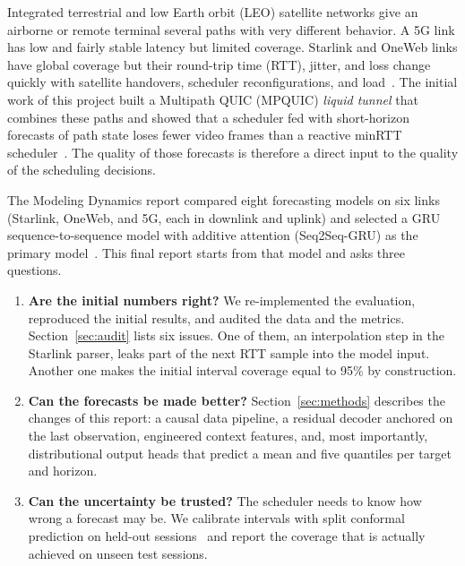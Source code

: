 Integrated terrestrial and low Earth orbit (LEO) satellite networks give an airborne or remote terminal several paths with very different behavior. A 5G link has low and fairly stable latency but limited coverage. Starlink and OneWeb links have global coverage but their round-trip time (RTT), jitter, and loss change quickly with satellite handovers, scheduler reconfigurations, and load~\cite{michel2022first,mohan2024multifaceted}. The initial work of this project built a Multipath QUIC (MPQUIC) \emph{liquid tunnel} that combines these paths and showed that a scheduler fed with short-horizon forecasts of path state loses fewer video frames than a reactive minRTT scheduler~\cite{deconinck2017multipath}. The quality of those forecasts is therefore a direct input to the quality of the scheduling decisions.

The Modeling Dynamics report compared eight forecasting models on six links (Starlink, OneWeb, and 5G, each in downlink and uplink) and selected a GRU sequence-to-sequence model with additive attention (Seq2Seq-GRU) as the primary model~\cite{cho2014learning,bahdanau2015neural}. This final report starts from that model and asks three questions.
\begin{enumerate}[leftmargin=*]
  \item \textbf{Are the initial numbers right?} We re-implemented the evaluation, reproduced the initial results, and audited the data and the metrics. Section~\ref{sec:audit} lists six issues. One of them, an interpolation step in the Starlink parser, leaks part of the next RTT sample into the model input. Another one makes the initial interval coverage equal to 95\% by construction.
  \item \textbf{Can the forecasts be made better?} Section~\ref{sec:methods} describes the changes of this report: a causal data pipeline, a residual decoder anchored on the last observation, engineered context features, and, most importantly, distributional output heads that predict a mean and five quantiles per target and horizon.
  \item \textbf{Can the uncertainty be trusted?} The scheduler needs to know how wrong a forecast may be. We calibrate intervals with split conformal prediction on held-out sessions~\cite{lei2018distribution,romano2019conformalized} and report the coverage that is actually achieved on unseen test sessions.
\end{enumerate}

